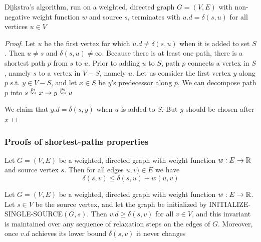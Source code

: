 \documentclass[11pt]{article}
\begin{document}
\begin{theorem}
Dijkstra's algorithm, run on a weighted, directed graph \(G=(V,E)\) with non-negative weight
function \(w\) and source \(s\), terminates with \(u.d=\delta(s,u)\) for all vertices \(u\in V\)
\end{theorem}

\begin{proof}
Let \(u\) be the first vertex for which \(u.d\neq\delta(s,u)\) when it is added to set \(S\).
Then \(u\neq s\) and \(\delta(s,u)\neq\infty\). Because there is at least one path, there is a shortest
path \(p\) from \(s\) to \(u\). Prior to adding \(u\) to \(S\), path \(p\) connects a vertex
in \(S\), namely \(s\) to a vertex in \(V-S\), namely \(u\). Let us consider the first
vertex \(y\) along \(p\) s.t. \(y\in V-S\), and let \(x\in S\) be \(y\)'s predecessor along \(p\).
We can decompose path \(p\) into \(s\overset{p_1}{\rightsquigarrow}x\to y\overset{p_2}{\rightsquigarrow}u\)

We claim that \(y.d=\delta(s,y)\) when \(u\) is added to \(S\). But \(y\) should be chosen after \(x\)
\end{proof}

\begin{exercise}

\end{exercise}
\subsubsection{Proofs of shortest-paths properties}
\label{sec:org292e937}
\begin{lemma}
Let \(G=(V,E)\) be a weighted, directed graph with weight function \(w:E\to\mathbb{R}\) and source
vertex \(s\). Then for all edges \(u,v)\in E\) we have
\begin{equation*}
\delta(s,v)\le\delta(s,u)+w(u,v)
\end{equation*}
\end{lemma}

\begin{lemma}
Let \(G=(V,E)\) be a weighted, directed graph with weight function \(w:E\to\mathbb{R}\). Let \(s\in V\) be
the source vertex, and let the graph be initialized by INITIALIZE-SINGLE-SOURCE\((G,s)\).
Then \(v.d\ge\delta(s,v)\) for all \(v\in V\), and this invariant is maintained over any sequence of
relaxation steps on the edges of \(G\). Moreover, once \(v.d\) achieves its lower
bound \(\delta(s,v)\) it never changes
\end{lemma}
\end{document}
